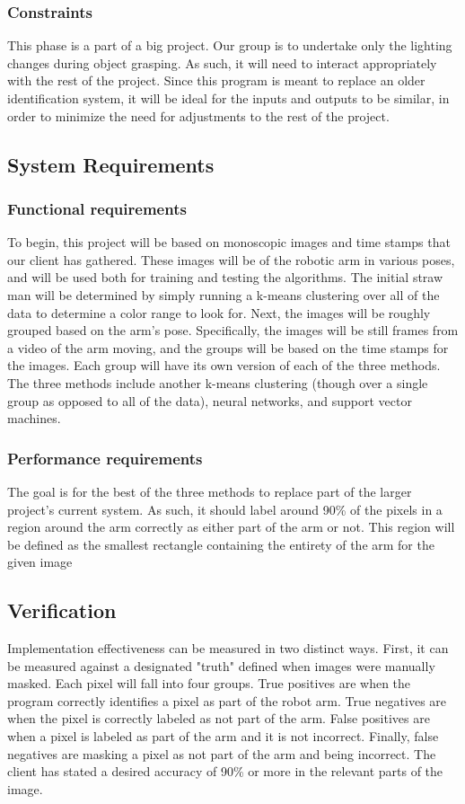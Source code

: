 \documentclass[10pt,journal,compsoc, draftclsnofoot,onecolumn]{IEEEtran}
\begin{document}
\subsubsection{Constraints}
This phase is a part of a big project.
Our group is to undertake only the lighting changes during object grasping.
As such, it will need to interact appropriately with the rest of the project.
Since this program is meant to replace an older identification system, it will be ideal for the inputs and outputs to be similar, in order to minimize the need for adjustments to the rest of the project.

\subsection{System Requirements}
\subsubsection{Functional requirements}
To begin, this project will be based on monoscopic images and time stamps that our client has gathered.
These images will be of the robotic arm in various poses, and will be used both for training and testing the algorithms.
The initial straw man will be determined by simply running a k-means clustering over all of the data to determine a color range to look for.
Next, the images will be roughly grouped based on the arm's pose.
Specifically, the images will be still frames from a video of the arm moving, and the groups will be based on the time stamps for the images.
Each group will have its own version of each of the three methods.
The three methods include another k-means clustering (though over a single group as opposed to all of the data), neural networks, and support vector machines.

\subsubsection{Performance requirements}
The goal is for the best of the three methods to replace part of the larger project's current system.
As such, it should label around 90\% of the pixels in a region around the arm correctly as either part of the arm or not. This region will be defined as the smallest rectangle containing the entirety of the arm for the given image

\subsection {Verification}
Implementation effectiveness can be measured in two distinct ways.
First, it can be measured against a designated "truth" defined when images were manually masked.
Each pixel will fall into four groups.
True positives are when the program correctly identifies a pixel as part of the robot arm.
True negatives are when the pixel is correctly labeled as not part of the arm.
False positives are when a pixel is labeled as part of the arm and it is not incorrect.
Finally, false negatives are masking a pixel as not part of the arm and being incorrect.
The client has stated a desired accuracy of 90\% or more in the relevant parts of the image.
\end{document}
